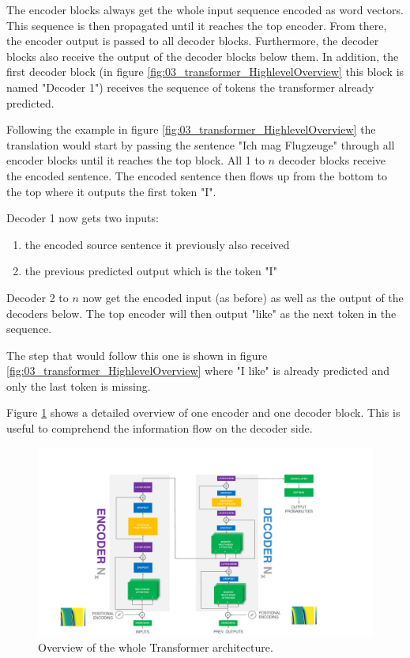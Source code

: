 The encoder blocks always get the whole input sequence encoded as word vectors. This sequence is then propagated until it reaches the top encoder. From there, the encoder output is passed to all decoder blocks. Furthermore, the decoder blocks also receive the output of the decoder blocks below them. In addition, the first decoder block {(in figure \ref{fig:03_transformer_HighlevelOverview} this block is named "Decoder 1")} receives the sequence of tokens the transformer already predicted. 
\medskip

Following the example in figure \ref{fig:03_transformer_HighlevelOverview} the translation would start by passing the sentence "Ich mag Flugzeuge" through all encoder blocks until it reaches the top block. All 1 to $n$ decoder blocks receive the encoded sentence. The encoded sentence then flows up from the bottom to the top where it outputs the first token "I". 

Decoder 1 now gets two inputs: 

\begin{enumerate}
	\item the encoded source sentence it previously also received
	\item the previous predicted output which is the token "I"
\end{enumerate}

Decoder 2 to $n$ now get the encoded input {(as before)} as well as the output of the decoders below. The top encoder will then output "like" as the next token in the sequence. 

The step that would follow this one is shown in figure \ref{fig:03_transformer_HighlevelOverview} where "I like" is already predicted and only the last token is missing.
\bigskip

Figure \ref{fig:03_transformer_overview} shows a detailed overview of one encoder and one decoder block. This is useful to comprehend the information flow on the decoder side.

\begin{figure}[t]
	\centering
	\includegraphics[width=\textwidth]{figures/03_theory/03_transformerArchitectureOverview}
	\caption{Overview of the whole Transformer architecture.}
	\label{fig:03_transformer_overview}
\end{figure}

